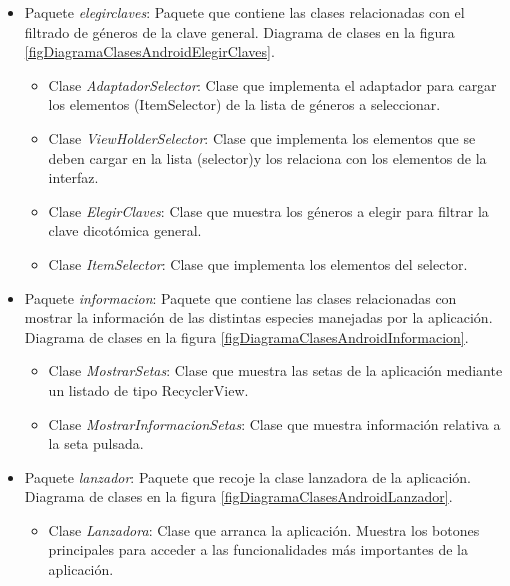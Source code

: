 \begin{itemize}
	
	\item Paquete \textit{elegirclaves}: Paquete que contiene las clases relacionadas con el filtrado de géneros de la clave general. Diagrama de clases en la figura \ref{figDiagramaClasesAndroidElegirClaves}.
	\begin{itemize}
		\item Clase \textit{AdaptadorSelector}: Clase que implementa el adaptador para cargar los elementos (ItemSelector) de la lista de géneros a seleccionar.
		\item Clase \textit{ViewHolderSelector}: Clase que implementa los elementos que se deben cargar en la lista (selector)y los relaciona con los elementos de la interfaz.
		\item Clase \textit{ElegirClaves}: Clase que muestra los géneros a elegir para filtrar la clave dicotómica general.
		\item Clase \textit{ItemSelector}: Clase que implementa los elementos del selector.
	\end{itemize}
	
	
	\item Paquete \textit{informacion}: Paquete que contiene las clases relacionadas con mostrar la información de las distintas especies manejadas por la aplicación. Diagrama de clases en la figura \ref{figDiagramaClasesAndroidInformacion}.
	\begin{itemize}
		\item Clase \textit{MostrarSetas}: Clase que muestra las setas de la aplicación mediante un listado de tipo RecyclerView.
		\item Clase \textit{MostrarInformacionSetas}: Clase que muestra información relativa a la seta pulsada.
	\end{itemize}
	
	
	\item Paquete \textit{lanzador}: Paquete que recoje la clase lanzadora de la aplicación. Diagrama de clases en la figura \ref{figDiagramaClasesAndroidLanzador}.
	\begin{itemize}
		\item Clase \textit{Lanzadora}: Clase que arranca la aplicación. Muestra los botones principales para acceder a las funcionalidades más importantes de la aplicación.
	\end{itemize}
	
	

\end{itemize}
